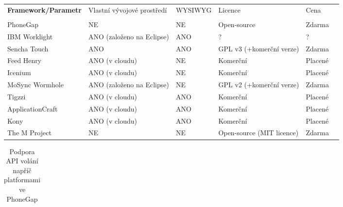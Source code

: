 \documentclass[thesis=B,czech]{FITthesis}[2012/06/26]
\begin{document}
\begin{landscape}
\begin{table}
\begin{tabularx}{21cm}{|p{4.5cm}|X|X|X|X|X|}
	\vspace{5 mm} \textbf{Framework/Parametr} & Vlastní vývojové prostředí & WYSIWYG & Licence & Cena \\
	\tabularnewline \hline \hline
	PhoneGap & NE & NE & Open-source & Zdarma \\
	IBM Worklight & ANO (založeno na Eclipse) & ANO & ? & ? \\
	Sencha Touch & ANO & ANO & GPL v3 (+komerční verze) & Zdarma \\
	Feed Henry & ANO (v cloudu) & NE & Komerční & Placené \\
	Icenium & ANO (v cloudu) & NE & Komerční & Placené \\
	MoSync Wormhole & ANO (založeno na Eclipse) & NE & GPL v2 (+komerční verze) & Zdarma \\
	Tigzzi & ANO (v cloudu) & ANO & Komerční & Placené \\
	ApplicationCraft & ANO (v cloudu) & ANO & Komerční & Placené \\
	Kony & ANO (v cloudu) & ANO & Komerční & Placené \\
	The M Project & NE & NE & Open-source (MIT licence) & Zdarma \\
    \hline
    \end{tabularx}
\end{table}

\begin{table}
\caption[Podpora API volání napříč platformami ve PhoneGap]{Podpora API volání napříč platformami ve PhoneGap}
	\label{tab:PhoneGapAPIComparsion}
\begin{tabularx}{21cm}{|p{4.3cm}|X|X|X|X|X|X|X|X|X|X|}
\hline


\end{tabularx}
\end{table}
\end{landscape}
\end{document}
